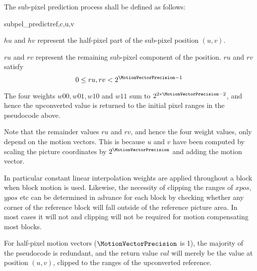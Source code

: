 The sub-pixel prediction process shall be defined as follows:

\begin{pseudo}{subpel\_predict}{ref,c,u,v}
\bsELSE
\bsEND
\end{pseudo} 

\begin{informative}
$hu$ and $hv$ represent the half-pixel part of the sub-pixel position $(u,v)$.

$ru$ and $rv$ represent the remaining sub-pixel component of the position.
$ru$ and $rv$ satisfy \[0\leq ru,rv <2^{\MotionVectorPrecision-1}\] 

The four weights $w00,w01,w10$ and $w11$ sum to $2^{2*\MotionVectorPrecision-2}$, and
hence the upconverted value is returned to the initial pixel ranges in the pseudocode 
above.

Note that the remainder values $ru$ and $rv$, and hence the four weight values, 
only depend on the motion vectors. This is because
$u$ and $v$ have been computed by scaling the picture coordinates by
$2^{\MotionVectorPrecision}$ and adding the motion vector.

In particular constant linear interpolation weights are applied throughout a 
block when block motion is used. Likewise, the necessity of clipping the ranges of
$xpos$, $ypos$ etc can be determined in advance for each block by checking whether any 
corner of the reference block will fall outside of the reference picture area. In most
cases it will not and clipping will not be required for motion compensating most blocks. 

For half-pixel motion vectors ($\MotionVectorPrecision$ is 1), the majority of the 
pseudocode is redundant, and the return value $val$ will merely be the value at 
position $(u,v)$, clipped to the ranges of the upconverted reference. 

\end{informative}

